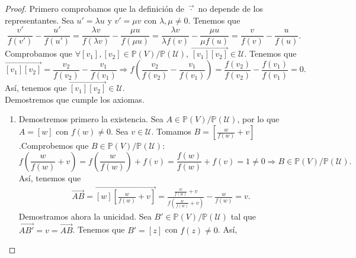 \begin{proof}
Primero comprobamos que la definición de $\displaystyle \vec{ \cdot} $ no depende de los representantes. Sea $\displaystyle u' = \lambda u $ y $\displaystyle v' = \mu v $ con $\displaystyle \lambda, \mu \neq 0 $. Tenemos que
\[\frac{v'}{f\left(v'\right)} - \frac{u'}{f\left(u'\right)} = \frac{\lambda v}{f\left(\lambda v\right)} - \frac{\mu u}{f\left(\mu u\right)} = \frac{\lambda v}{\lambda f\left(v\right)} - \frac{\mu u}{\mu f\left(u\right)} = \frac{v}{f\left(v\right)} - \frac{u}{f\left(u\right)} .\]
Comprobamos que $\displaystyle \forall [v_{1}], [v_{2}] \in \mathbb{P}\left(V\right)/\mathbb{P}\left(\mathcal{U}\right) $, $\displaystyle \overrightarrow{[v_{1}][v_{2}]} \in \mathcal{U} $. Tenemos que
\[\overrightarrow{[v_{1}][v_{2}]} = \frac{v_{2}}{f\left(v_{2}\right)} - \frac{v_{1}}{f\left(v_{1}\right)} \Rightarrow f\left(\frac{v_{2}}{f\left(v_{2}\right)} - \frac{v_{1}}{f\left(v_{1}\right)}\right) = \frac{f\left(v_{2}\right)}{f\left(v_{2}\right)} - \frac{f\left(v_{1}\right)}{f\left(v_{1}\right)} = 0.\]
Así, tenemos que $\displaystyle \overrightarrow{[v_{1}][v_{2}]} \in \mathcal{U} $. \\
Demostremos que cumple los axiomas. 
\begin{enumerate}
	\item Demostremos primero la existencia. Sea $\displaystyle A \in \mathbb{P}\left(V\right) / \mathbb{P}\left(\mathcal{U}\right) $, por lo que $\displaystyle A = [w] $ con $\displaystyle f\left(w\right) \neq 0 $. Sea $\displaystyle v \in \mathcal{U} $. Tomamos $\displaystyle B = \left[\frac{w}{f\left(w\right)} + v\right] $.Comprobemos que $\displaystyle B \in \mathbb{P}\left(V\right) / \mathbb{P}\left(\mathcal{U}\right) $:
	\[f\left(\frac{w}{f\left(w\right)} + v\right) = f\left(\frac{w}{f\left(w\right)}\right) + f\left(v\right) = \frac{f\left(w\right)}{f\left(w\right)} + f\left(v\right) = 1 \neq 0 \Rightarrow B \in \mathbb{P}\left(V\right) / \mathbb{P}\left(\mathcal{U}\right) .\]
Así, tenemos que 
\[
\begin{split}
	\overrightarrow{AB} = \overrightarrow{[w]\left[\frac{w}{f\left(w\right)} + v\right] } = \frac{\frac{w}{f\left(w\right)} + v}{f\left(\frac{w}{f\left(w\right)}+v\right)}-\frac{w}{f\left(w\right)} = v .
\end{split}
\]
Demostramos ahora la unicidad. Sea $\displaystyle B' \in \mathbb{P}\left(V\right)/\mathbb{P}\left(\mathcal{U}\right) $ tal que $\displaystyle \overrightarrow{AB'} = v = \overrightarrow{AB} $. Tenemos que $\displaystyle B' = [z] $ con $\displaystyle f\left(z\right) \neq 0 $. Así, 

\end{enumerate}
\end{proof}
